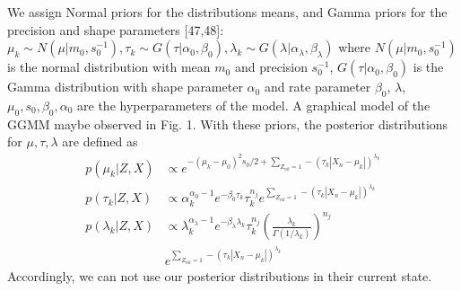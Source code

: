 \documentclass[conference]{IEEEtran}
\begin{document}

We assign Normal priors for the distributions means, and Gamma
priors for the precision and shape parameters [47,48]:
$\mu_k \sim N(\mu| m_0, s_0^{-1}), \tau_k \sim G(\tau|\alpha_0, \beta_0), \lambda_k \sim G(\lambda|\alpha_{\lambda}, \beta_{\lambda})$ where $N(\mu| m_0, s_0^{-1})$
is the normal distribution with mean $m_0$ and precision $s_0^{-1}$, $G(\tau|\alpha_0, \beta_0)$
is the Gamma distribution with shape parameter
$\alpha_0$ and rate parameter $\beta_0$, $\lambda$, $\mu_0, s_0, \beta_0, \alpha_0$ are the 
hyperparameters of the model. A graphical model of the GGMM maybe observed in Fig. 1.
With these priors, the posterior distributions for $\mu, \tau, \lambda$ are\cite{b9} defined as
\begin{equation}
    \begin{split}
        p(\mu_k|Z, X) &\propto e ^{{-(\mu_k - \mu_0)^2 s_0/2} + \sum_{Z_{nk} = 1} - (\tau_k|X_n - \mu_k|)^{\lambda_k}}   \\
        p(\tau_k|Z, X) &\propto \alpha_k ^{\alpha_0 - 1} e ^{-\beta_0 \tau_k}\tau_k^{n_j} e ^{\sum_{Z_{nk} = 1} - (\tau_k|X_n - \mu_k|)^{\lambda_k}}   \\
        p(\lambda_k|Z, X) &\propto \lambda_k ^{\alpha_\lambda - 1} e ^{-\beta_\lambda \lambda_k}\tau_k^{n_j}(\frac{\lambda_k}{\Gamma(1/\lambda_k)})^{n_j} \\
        &e ^{\sum_{Z_{nk} = 1} - (\tau_k|X_n - \mu_k|)^{\lambda_k}}  
    \end{split}
\end{equation}
Accordingly, we can not use our posterior distributions in their current state. 
\end{document}

